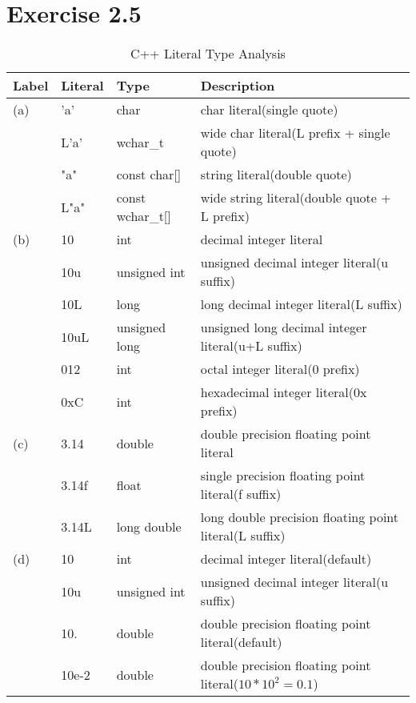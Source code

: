 \documentclass{article}
\begin{document}
\section*{Exercise 2.5}

\begin{table}[htbp]
\centering
\caption{C++ Literal Type Analysis}
\label{tab:literals}
\begin{tabularx}{\textwidth}{@{}>{\ttfamily}l l l >{\RaggedRight}X@{}}
\toprule
\textnormal{Label} & \textnormal{Literal} & \textnormal{Type} & \textnormal{Description} \\
\midrule
(a) & 'a'      & char        & char literal(single quote) \\
    & L'a'     & wchar\_t    & wide char literal(L prefix + single quote) \\
    & "a"      & const char[] & string literal(double quote) \\
    & L"a"     & const wchar\_t[] & wide string literal(double quote + L prefix) \\
\midrule
(b) & 10       & int         & decimal integer literal \\
    & 10u      & unsigned int & unsigned decimal integer literal(u suffix) \\
    & 10L      & long        & long decimal integer literal(L suffix) \\
    & 10uL     & unsigned long & unsigned long decimal integer literal(u+L suffix) \\
    & 012      & int         & octal integer literal(0 prefix) \\
    & 0xC      & int         & hexadecimal integer literal(0x prefix) \\
\midrule
(c) & 3.14     & double      & double precision floating point literal \\
    & 3.14f    & float       & single precision floating point literal(f suffix) \\
    & 3.14L    & long double & long double precision floating point literal(L suffix) \\
\midrule
(d) & 10       & int         & decimal integer literal(default) \\
    & 10u      & unsigned int & unsigned decimal integer literal(u suffix) \\
    & 10.      & double      & double precision floating point literal(default) \\
    & 10e-2    & double      & double precision floating point literal($10 * 10^{2} = 0.1$) \\
\bottomrule
\end{tabularx}
\end{table}
\end{document}
